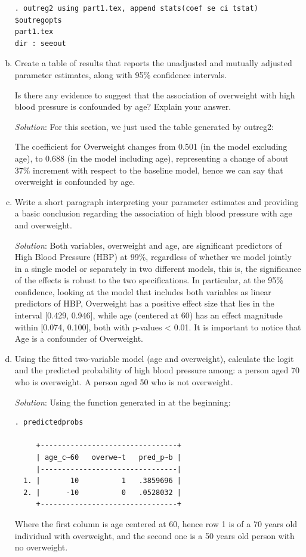 \documentclass{article}
\begin{document}
\begin{enumerate}[a.]
\begin{verbatim}
. outreg2 using part1.tex, append stats(coef se ci tstat) $outregopts
part1.tex
dir : seeout
\end{verbatim}
     
     \item  Create a table of results that reports the unadjusted and mutually adjusted parameter estimates, along with 95$\%$ confidence intervals.  
     
     Is there any evidence to suggest that the association of overweight with high blood pressure is confounded by age?  Explain your answer.
     
     \textit{Solution}: For this section, we just used the table generated by outreg2:
     
     
     
     The coefficient for Overweight changes from 0.501 (in the model excluding age), to 0.688 (in the model including age), representing a change of about 37\% increment with respect to the baseline model, hence we can say that overweight is confounded by age.
     
     \item Write a short paragraph interpreting your parameter estimates and providing a basic conclusion regarding the association of high blood pressure with age and overweight.
     
     \textit{Solution}: Both variables, overweight and age, are significant predictors of High Blood Pressure (HBP) at 99\%, regardless of whether we model jointly in a single model or separately in two different models, this is, the significance of the effects is robust to the two specifications. In particular, at the 95\% confidence, looking at the model that includes both variables as linear predictors of HBP, Overweight has a positive effect size that lies in the interval [0.429, 0.946], while age (centered at 60) has an effect magnitude within [0.074, 0.100], both with p-values < 0.01. It is important to notice that Age is a confounder of Overweight. 
     
     \item Using the fitted two-variable model (age and overweight), calculate the logit and the predicted probability of high blood pressure among: a person aged 70 who is overweight. A person aged 50 who is not overweight.
     
     \textit{Solution}: Using the function generated in at the beginning:
     
\begin{verbatim}
. predictedprobs

     +--------------------------------+
     | age_c~60   overwe~t   pred_p~b |
     |--------------------------------|
  1. |       10          1   .3859696 |
  2. |      -10          0   .0528032 |
     +--------------------------------+

\end{verbatim}

Where the first column is age centered at 60, hence row 1 is of a 70 years old individual with overweight, and the second one is a 50 years old person with no overweight.
     
 \end{enumerate}
\end{document}
